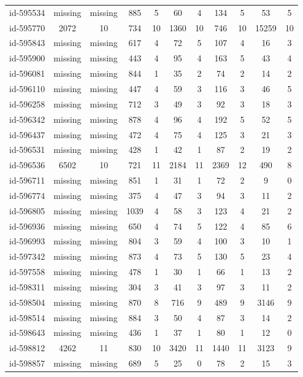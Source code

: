 \begin{tabular}{ccccccccccc}
id-595534 & missing & missing & 885 & 5 & 60 & 4 & 134 & 5 & 53 & 5\\
id-595770 & 2072 & 10 & 734 & 10 & 1360 & 10 & 746 & 10 & 15259 & 10\\
id-595843 & missing & missing & 617 & 4 & 72 & 5 & 107 & 4 & 16 & 3\\
id-595900 & missing & missing & 443 & 4 & 95 & 4 & 163 & 5 & 43 & 4\\
id-596081 & missing & missing & 844 & 1 & 35 & 2 & 74 & 2 & 14 & 2\\
id-596110 & missing & missing & 447 & 4 & 59 & 3 & 116 & 3 & 46 & 5\\
id-596258 & missing & missing & 712 & 3 & 49 & 3 & 92 & 3 & 18 & 3\\
id-596342 & missing & missing & 878 & 4 & 96 & 4 & 192 & 5 & 52 & 5\\
id-596437 & missing & missing & 472 & 4 & 75 & 4 & 125 & 3 & 21 & 3\\
id-596531 & missing & missing & 428 & 1 & 42 & 1 & 87 & 2 & 19 & 2\\
id-596536 & 6502 & 10 & 721 & 11 & 2184 & 11 & 2369 & 12 & 490 & 8\\
id-596711 & missing & missing & 851 & 1 & 31 & 1 & 72 & 2 & 9 & 0\\
id-596774 & missing & missing & 375 & 4 & 47 & 3 & 94 & 3 & 11 & 2\\
id-596805 & missing & missing & 1039 & 4 & 58 & 3 & 123 & 4 & 21 & 2\\
id-596936 & missing & missing & 650 & 4 & 74 & 5 & 122 & 4 & 85 & 6\\
id-596993 & missing & missing & 804 & 3 & 59 & 4 & 100 & 3 & 10 & 1\\
id-597342 & missing & missing & 873 & 4 & 73 & 5 & 130 & 5 & 23 & 4\\
id-597558 & missing & missing & 478 & 1 & 30 & 1 & 66 & 1 & 13 & 2\\
id-598311 & missing & missing & 304 & 3 & 41 & 3 & 97 & 3 & 11 & 2\\
id-598504 & missing & missing & 870 & 8 & 716 & 9 & 489 & 9 & 3146 & 9\\
id-598514 & missing & missing & 884 & 3 & 50 & 4 & 87 & 3 & 14 & 2\\
id-598643 & missing & missing & 436 & 1 & 37 & 1 & 80 & 1 & 12 & 0\\
id-598812 & 4262 & 11 & 830 & 10 & 3420 & 11 & 1440 & 11 & 3123 & 9\\
id-598857 & missing & missing & 689 & 5 & 25 & 0 & 78 & 2 & 15 & 3\\

\end{tabular}
